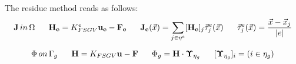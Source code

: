 The residue method reads as follows:
$$\vect{J} \, in  \, \Omega \psp{10}
\vect{H_e} = K_{FSGV}^e \vect{u_e} - \vect{F_e} 
\psp{10}
\vect{J_e}(\vec{x}) = \sum_{j\in \eta^e}[\vect{H_e}]_j\vec{\tau}_j^e(\vec{x})
\psp{10}
\vec{\tau}_j^e(\vec{x})=\dfrac{\vec{x}-\vec{x}_j}{|e|}$$

$$\Phi \, on  \, \Gamma_g 
\psp{10}
\vect{H} = K_{FSGV} \vect{u} - \vect{F} 
\psp{10}
\Phi_g = \vect{H} \cdot \vect{\Upsilon}_{\eta_g}
\psp{10}
[\vect{\Upsilon}_{\eta_g}]_i=(i\in \eta_g) $$